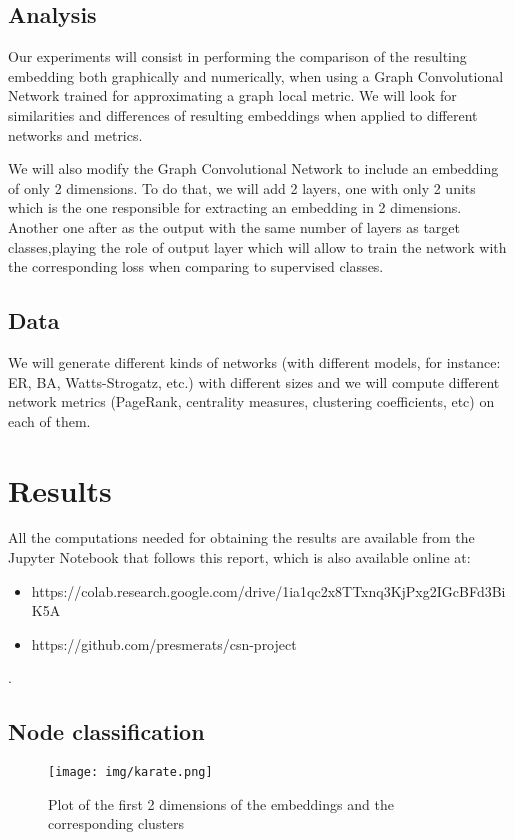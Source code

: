 \documentclass[a4paper]{article}
\begin{document}
\subsection{Analysis} 
Our experiments will consist in performing the comparison of the resulting embedding  both graphically and numerically, when using a Graph Convolutional Network trained for approximating a graph local metric. We will look for similarities and differences of resulting embeddings when applied to different networks and metrics.

We will also modify the Graph Convolutional Network to include an embedding of only 2 dimensions. To do that, we will add 2 layers, one with only 2 units which is the one responsible for extracting an embedding in 2 dimensions. Another one after as the output with the same number of layers as target classes,playing the role of output layer which will allow to train the network with the corresponding loss when comparing to supervised classes.


\subsection{Data}
We will generate different kinds of networks (with different models, for instance: ER, BA, Watts-Strogatz, etc.) with different sizes and we will compute different network metrics (PageRank, centrality measures, clustering coefficients, etc) on each of them. 



\section{Results} \label{res}

All the computations needed for obtaining the results are available from the Jupyter Notebook that follows this report, which is also available online at:
\begin{itemize}
    \item https://colab.research.google.com/drive/1ia1qc2x8TTxnq3KjPxg2IGcBFd3BiK5A 
    \item https://github.com/presmerats/csn-project
    
\end{itemize}.

\subsection{Node classification}
\begin{figure}[H]
    \centering
    \texttt{[image: img/karate.png]}
    \caption{Plot of the first 2 dimensions of the embeddings and the corresponding clusters}\label{fig:clust}
\end{figure}
\end{document}
